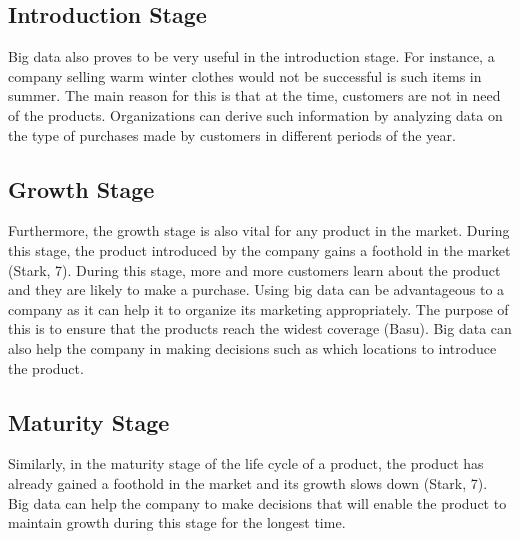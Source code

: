 \documentclass[sigconf]{acmart}
\begin{document}
\subsection{Introduction Stage}
Big data also proves to be very useful in the introduction stage. For instance, a company selling warm winter clothes would not be successful is such items in summer. The main reason for this is that at the time, customers are not in need of the products. Organizations can derive such information by analyzing data on the type of purchases made by customers in different periods of the year.
\subsection{Growth Stage}
Furthermore, the growth stage is also vital for any product in the market. During this stage, the product introduced by the company gains a foothold in the market (Stark, 7). During this stage, more and more customers learn about the product and they are likely to make a purchase. Using big data can be advantageous to a company as it can help it to organize its marketing appropriately. The purpose of this is to ensure that the products reach the widest coverage (Basu). Big data can also help the company in making decisions such as which locations to introduce the product.
\subsection{Maturity Stage}
Similarly, in the maturity stage of the life cycle of a product, the product has already gained a foothold in the market and its growth slows down (Stark, 7). Big data can help the company to make decisions that will enable the product to maintain growth during this stage for the longest time.
\end{document}
